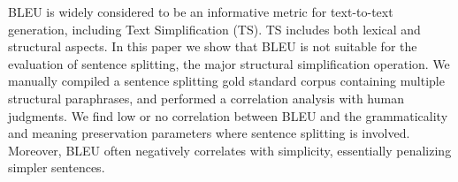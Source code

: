 BLEU is widely considered to be an informative metric for text-to-text generation, including Text Simplification (TS). TS includes both lexical and structural aspects. In this paper we show that BLEU is not suitable for the evaluation of sentence splitting, the major structural simplification operation. We manually compiled a sentence splitting gold standard corpus containing multiple structural paraphrases, and performed a correlation analysis with human judgments. We find low or no correlation between BLEU and the grammaticality and meaning preservation parameters where sentence splitting is involved. Moreover, BLEU often negatively correlates with simplicity, essentially penalizing simpler sentences.
